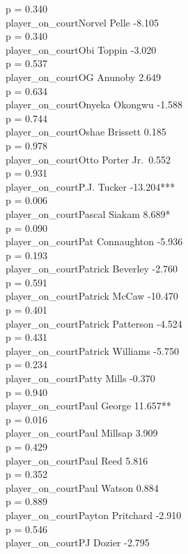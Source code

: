 \documentclass[
  landscape]{article}
\begin{document}
p = 0.340\\
player\_on\_courtNorvel Pelle -8.105\\
p = 0.340\\
player\_on\_courtObi Toppin -3.020\\
p = 0.537\\
player\_on\_courtOG Anunoby 2.649\\
p = 0.634\\
player\_on\_courtOnyeka Okongwu -1.588\\
p = 0.744\\
player\_on\_courtOshae Brissett 0.185\\
p = 0.978\\
player\_on\_courtOtto Porter Jr.~0.552\\
p = 0.931\\
player\_on\_courtP.J. Tucker -13.204***\\
p = 0.006\\
player\_on\_courtPascal Siakam 8.689*\\
p = 0.090\\
player\_on\_courtPat Connaughton -5.936\\
p = 0.193\\
player\_on\_courtPatrick Beverley -2.760\\
p = 0.591\\
player\_on\_courtPatrick McCaw -10.470\\
p = 0.401\\
player\_on\_courtPatrick Patterson -4.524\\
p = 0.431\\
player\_on\_courtPatrick Williams -5.750\\
p = 0.234\\
player\_on\_courtPatty Mills -0.370\\
p = 0.940\\
player\_on\_courtPaul George 11.657**\\
p = 0.016\\
player\_on\_courtPaul Millsap 3.909\\
p = 0.429\\
player\_on\_courtPaul Reed 5.816\\
p = 0.352\\
player\_on\_courtPaul Watson 0.884\\
p = 0.889\\
player\_on\_courtPayton Pritchard -2.910\\
p = 0.546\\
player\_on\_courtPJ Dozier -2.795\\
\end{document}
